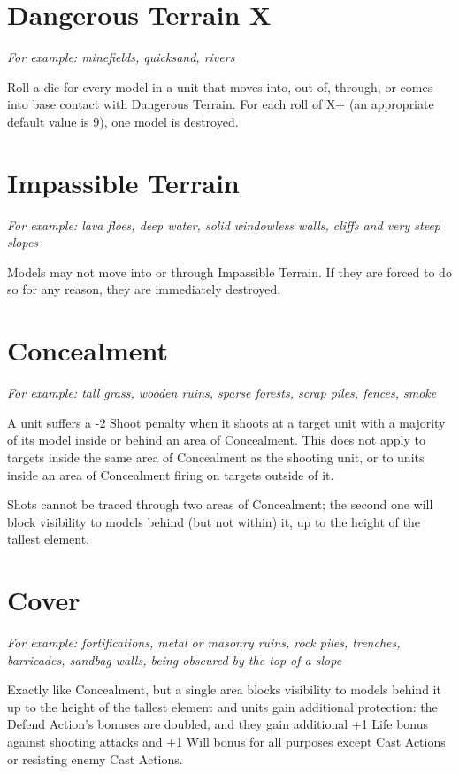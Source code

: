 \begin{multicols}{2}
\section*{Dangerous Terrain X}
\textit{For example: minefields, quicksand, rivers}

Roll a die for every model in a unit that moves into, out of, through, or comes into base contact with Dangerous Terrain. For each roll of X+ (an appropriate default value is 9), one model is destroyed.




\section*{Impassible Terrain}
\textit{For example: lava floes, deep water, solid windowless walls, cliffs and very steep slopes}

Models may not move into or through Impassible Terrain. If they are forced to do so for any reason, they are immediately destroyed.




\section*{Concealment}
\textit{For example: tall grass, wooden ruins, sparse forests, scrap piles, fences, smoke}

A unit suffers a -2 Shoot penalty when it shoots at a target unit with a majority of its model inside or behind an area of Concealment. This does not apply to targets inside the same area of Concealment as the shooting unit, or to units inside an area of Concealment firing on targets outside of it.

Shots cannot be traced through two areas of Concealment; the second one will block visibility to models behind (but not within) it, up to the height of the tallest element.




\section*{Cover}
\textit{For example: fortifications, metal or masonry ruins, rock piles, trenches, barricades, sandbag walls, being obscured by the top of a slope}

Exactly like Concealment, but a single area blocks visibility to models behind it up to the height of the tallest element and units gain additional protection: the Defend Action's bonuses are doubled, and they gain additional +1 Life bonus against shooting attacks and +1 Will bonus for all purposes except Cast Actions or resisting enemy Cast Actions.



\end{multicols}
